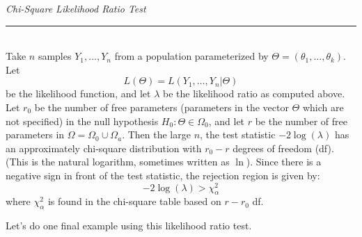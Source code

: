 \documentclass[notes.tex]{subfiles}
\begin{document}
\begin{framed}
\emph{Chi-Square Likelihood Ratio Test}\\
  \rule{\dimexpr{}\fboxrule}{.1pt} \\
Take $n$ samples $Y_1, \dots, Y_n$ from a population parameterized by $\Theta = (\theta_1, \dots, \theta_k)$. Let 
\[
L(\Theta) = L(Y_1, \dots, Y_n|\Theta)
\]
be the likelihood function, and let $\lambda$ be the likelihood ratio as computed above. Let $r_0$ be the number of free parameters (parameters in the vector $\Theta$ which are not specified) in the null hypothesis $H_0: \Theta \in \Omega_0$, and let $r$ be the number of free parameters in $\Omega = \Omega_0 \cup \Omega_a$. Then the large $n$, the test statistic $-2 \log(\lambda)$ has an approximately chi-square distribution with $r_0 - r$ degrees of freedom (df). (This is the natural logarithm, sometimes written as $\ln$). Since there is a negative sign in front of the test statistic, the rejection region is given by:
\[
-2 \log(\lambda) > \chi_\alpha^2
\]
where $\chi_\alpha^2$ is found in the chi-square table based on $r - r_0$ df.
\end{framed}

Let's do one final example using this likelihood ratio test. 
\end{document}
